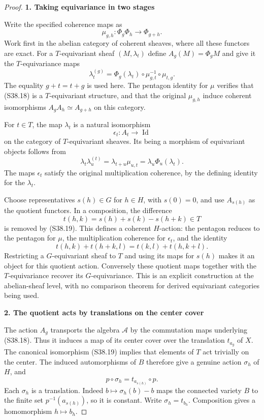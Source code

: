\begin{proof}
\par

\medskip\noindent\textbf{1. Taking equivariance in two stages}\quad

Write the specified coherence maps as \[
 \mu_{g,h}:\Phi_g\Phi_h\longrightarrow\Phi_{g+h}.
\] Work first in the abelian category of coherent sheaves, where all these functors are exact. For a \(T\)-equivariant sheaf \((M,\lambda_t)\) define \(A_g(M)=\Phi_gM\) and give it the \(T\)-equivariance maps \[
 \lambda_t^{(g)}
  =\Phi_g(\lambda_t)\circ\mu_{g,t}^{-1}\circ\mu_{t,g}.
 \tag{S38.18}
\] The equality \(g+t=t+g\) is used here. The pentagon identity for \(\mu\) verifies that (S38.18) is a \(T\)-equivariant structure, and that the original \(\mu_{g,h}\) induce coherent isomorphisms \(A_gA_h\simeq A_{g+h}\) on this category.

For \(t\in T\), the map \(\lambda_t\) is a natural isomorphism \[
 \epsilon_t:A_t\longrightarrow\operatorname{Id}
 \tag{S38.19}
\] on the category of \(T\)-equivariant sheaves. Its being a morphism of equivariant objects follows from \[
 \lambda_t\lambda_u^{(t)}
    =\lambda_{t+u}\mu_{u,t}
    =\lambda_u\Phi_u(\lambda_t).
\] The maps \(\epsilon_t\) satisfy the original multiplication coherence, by the defining identity for the \(\lambda_t\).

Choose representatives \(s(h)\in G\) for \(h\in H\), with \(s(0)=0\), and use \(A_{s(h)}\) as the quotient functors. In a composition, the difference \[
 t(h,k)=s(h)+s(k)-s(h+k)\in T
\] is removed by (S38.19). This defines a coherent \(H\)-action: the pentagon reduces to the pentagon for \(\mu\), the multiplication coherence for \(\epsilon_t\), and the identity \[
 t(h,k)+t(h+k,l)=t(k,l)+t(h,k+l).
\] Restricting a \(G\)-equivariant sheaf to \(T\) and using its maps for \(s(h)\) makes it an object for this quotient action. Conversely these quotient maps together with the \(T\)-equivariance recover its \(G\)-equivariance. This is an explicit construction at the abelian-sheaf level, with no comparison theorem for derived equivariant categories being used.

\par

\medskip\noindent\textbf{2. The quotient acts by translations on the center cover}\quad

The action \(A_g\) transports the algebra \(\mathscr A\) by the commutation maps underlying (S38.18). Thus it induces a map of its center cover over the translation \(t_{a_g}\) of \(X\). The canonical isomorphism (S38.19) implies that elements of \(T\) act trivially on the center. The induced automorphisms of \(B\) therefore give a genuine action \(\sigma_h\) of \(H\), and \[
 p\circ\sigma_h=t_{a_{s(h)}}\circ p.
 \tag{S38.20}
\] Each \(\sigma_h\) is a translation. Indeed \(b\mapsto\sigma_h(b)-b\) maps the connected variety \(B\) to the finite set \(p^{-1}(a_{s(h)})\), so it is constant. Write \(\sigma_h=t_{b_h}\). Composition gives a homomorphism \(h\mapsto b_h\).


\end{proof}
